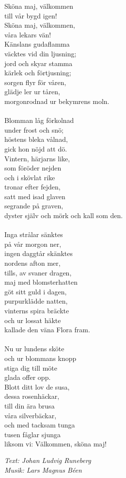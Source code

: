 \vspace{10pt}
Sköna maj, välkommen\\
till vår bygd igen! \\
Sköna maj, välkommen,\\
våra lekars vän!\\
Känslans gudaflamma\\
väcktes vid din ljusning;\\
jord och skyar stamma\\
kärlek och förtjusning;\\ 
sorgen flyr för våren,\\
glädje ler ur tåren,\\
morgonrodnad ur bekymrens moln.\\
\\
Blomman låg förkolnad\\
under frost och snö;\\
höstens bleka vålnad,\\
gick hon nöjd att dö.\\
Vintern, härjarns like,\\ 
som föröder nejden\\
och i skövlat rike\\
tronar efter fejden,\\ 
satt med isad glaven\\
segrande på graven,\\
dyster själv och mörk och kall som den.\\
\\
Inga strålar sänktes\\
på vår morgon ner,\\
ingen daggtår skänktes\\
nordens afton mer,\\
tills, av svaner dragen,\\
maj med blomsterhatten\\
göt sitt guld i dagen,\\
purpurklädde natten,\\
vinterns spira bräckte\\ 
och ur lossat häkte\\
kallade den väna Flora fram.\\
\\
Nu ur lundens sköte\\
och ur blommans knopp\\ 
stiga dig till möte\\
glada offer opp.\\
Blott ditt lov de susa,\\
dessa rosenhäckar,\\
till din ära brusa\\
våra silverbäckar,\\
och med tacksam tunga\\
tusen fåglar sjunga\\
liksom vi: Välkommen, sköna maj!
\par
\vspace{10pt}
{\footnotesize\textit{Text: Johan Ludvig Runeberg\\ Musik: Lars Magnus Béen}}
